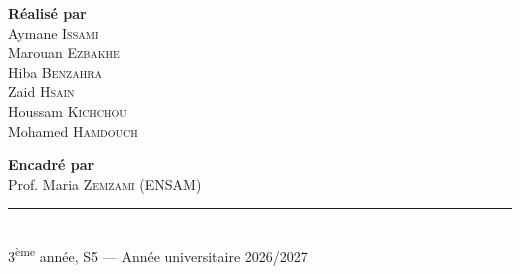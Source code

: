 \begin{titlepage}
    \vfill

    \begin{minipage}[t]{0.5\textwidth}
        \centering
        {\normalsize\textbf{Réalisé par}}\\[0.2cm]
        Aymane \textsc{Issami}\\[0.05cm]
        Marouan \textsc{Ezbakhe}\\[0.05cm]
        Hiba \textsc{Benzahra}\\[0.05cm]
        Zaid \textsc{Hsain}\\[0.05cm]
        Houssam \textsc{Kichchou}\\[0.05cm]
        Mohamed \textsc{Hamdouch}
    \end{minipage}\hfill
    \begin{minipage}[t]{0.46\textwidth}
        \centering
        {\normalsize\textbf{Encadré par}}\\[0.2cm]
        Prof. Maria \textsc{Zemzami} {\small (ENSAM)}
    \end{minipage}

    \vfill

    {\color{ensambleu}\rule{\textwidth}{0.8pt}}\\[0.2cm]
    {\small 3\textsuperscript{ème} année, S5 --- Année universitaire 2026/2027}

\end{titlepage}
